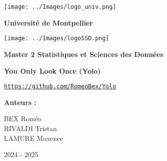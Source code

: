 \begin{titlepage}

    \begin{minipage}{0.3\linewidth}
     \texttt{[image: ../Images/logo\_univ.png]}   
    \end{minipage}
    \begin{minipage}{0.7\linewidth}
    \LARGE
            \textbf{Université de Montpellier} 
    \end{minipage}
    
    \begin{minipage}{0.3\linewidth}
     \texttt{[image: ../Images/logoSSD.png]}   
    \end{minipage}
    \begin{minipage}{0.7\linewidth}
    \LARGE
            \textbf{Master 2 Statistiques et Sciences des Données}        
    \end{minipage}
    
    \vspace*{1cm}
    
        \begin{center}
         
            \Huge
    
    \hrulefill
            
            \textbf{You Only Look Once (Yolo)}
    
    \hrulefill

            \vspace{0.5cm}
                
            \large
            \href{https://github.com/RomeoBex/Yolo}{\texttt{https://github.com/RomeoBex/Yolo}}
        
                
                        
            \vspace{2cm}
    
            \Large
            \begin{minipage}[t]{0.4\textwidth}
                 \textbf{Auteurs :}
            \end{minipage}
            \hfill
            \begin{minipage}[t]{0.45\textwidth}
                \raggedleft
                BEX Roméo\\
                RIVALDI Tristan\\ 
                LAMURE Maxence
            \end{minipage}
                
                
            \vspace{9cm}
            \large
            2024 - 2025
                
        \end{center}
    \end{titlepage}